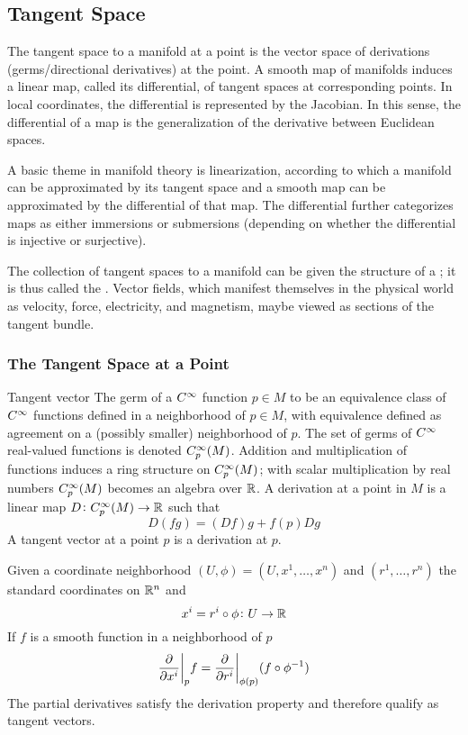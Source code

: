 \subsection{Tangent Space}

The tangent space to a manifold at a point is the vector space of derivations (germs/directional derivatives) at the point.
A smooth map of manifolds induces a linear map, called its differential, of tangent spaces at corresponding points.
In local coordinates, the differential is represented by the Jacobian.
In this sense, the differential of a map is the generalization of the derivative between Euclidean spaces.

A basic theme in manifold theory is linearization, according to which a manifold can be approximated by its tangent space and a smooth map can be approximated by the differential of that map.
The differential further categorizes maps as either immersions or submersions (depending on whether the differential is injective or surjective).

The collection of tangent spaces to a manifold can be given the structure of a ; it is thus called the .
Vector fields, which manifest themselves in the physical world as velocity, force, electricity, and magnetism, maybe viewed as sections of the tangent bundle.

\subsubsection{The Tangent Space at a Point}

\begin{definition}{Tangent vector}{}
    The germ of a \(C^\infty\) function \(p \in M\) to be an equivalence class of \(C^\infty\) functions defined in a neighborhood of \(p \in M\), with equivalence defined as agreement on a (possibly smaller) neighborhood of \(p\).
    The set of germs of \(C^\infty\) real-valued functions is denoted \(C^\infty_p(M)\).
    Addition and multiplication of functions induces a ring structure on \(C^\infty_p(M)\); with scalar multiplication by real numbers \(C^\infty_p(M)\) becomes an algebra over \(\mathbb{R}\).
    A derivation at a point in \(M\) is a linear map \(D \colon C^\infty_p(M) \rightarrow \mathbb{R}\) such that
    \[
        D(fg) = (Df)g + f(p)Dg
    \]
    A tangent vector at a point \(p\) is a derivation at \(p\).
\end{definition}

Given a coordinate neighborhood \((U, \phi) = (U, x^1, \dots, x^n)\) and \((r^1, \dots, r^n)\) the standard coordinates on \(\mathbb{R}^n\) and
\[
    x^i = r^i \circ \phi \colon U \rightarrow \mathbb{R}
\]
If \(f\) is a smooth function in a neighborhood of \(p\)
\[
    \evalat[\bigg]{\pdv{}{x^i}}{p} f = \evalat[\bigg]{\pdv{}{r^i}}{\phi(p)} (f \circ \phi^{-1})
\]
The partial derivatives satisfy the derivation property and therefore qualify as tangent vectors.

